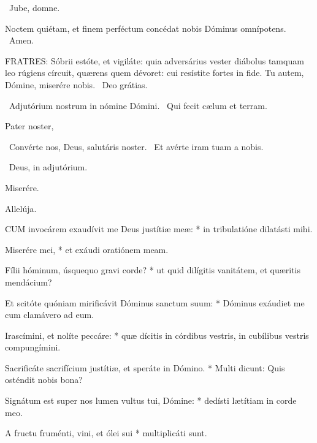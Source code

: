 \sectionornament


\V\ Jube, domne.

 Noctem quiétam, et finem perféctum concédat nobis Dóminus omnípotens. \R\ Amen.


\lettrine[lines=2]{F}{RATRES}: Sóbrii estóte, et vigiláte: quia adversárius vester diábolus tamquam leo rúgiens círcuit, quærens quem dévoret: cui resístite fortes in fide. Tu autem, Dómine, miserére nobis. \R\ Deo grátias.

\V\ Adjutórium nostrum in nómine Dómini. \R\ Qui fecit cælum et terram.

Pater noster, 


\V\ Convérte nos, Deus, salutáris noster. \R\ Et avérte iram tuam a nobis.

\V\ Deus, in adjutórium.


 Miserére.


 Allelúja.



\lettrine[lines=2]{C}{UM} invocárem exaudívit me Deus justítiæ meæ: * in tribulatióne dilatásti mihi.

Miserére mei, * et exáudi oratiónem meam.

Fílii hóminum, úsquequo gravi corde? * ut quid dilígitis vanitátem, et quæritis mendácium?

Et scitóte quóniam mirificávit Dóminus sanctum suum: * Dóminus exáudiet me cum clamávero ad eum.

Irascímini, et nolíte peccáre: * quæ dícitis in córdibus vestris, in cubílibus vestris compungímini.

Sacrificáte sacrifícium justítiæ, et speráte in Dómino. * Multi dicunt: Quis osténdit nobis bona?

Signátum est super nos lumen vultus tui, Dómine: * dedísti lætítiam in corde meo.

A fructu fruménti, vini, et ólei sui * multiplicáti sunt.

